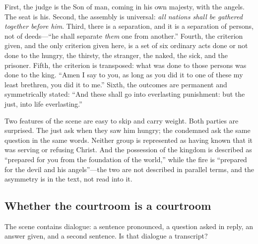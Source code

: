First, the judge is the Son of man, coming in his own majesty, with the angels. The seat is his. Second, the assembly is universal: \emph{all nations shall be gathered together before him}. Third, there is a separation, and it is a separation of persons, not of deeds---``he shall separate \emph{them} one from another.'' Fourth, the criterion given, and the only criterion given here, is a set of six ordinary acts done or not done to the hungry, the thirsty, the stranger, the naked, the sick, and the prisoner. Fifth, the criterion is transposed: what was done to those persons was done to the king. ``Amen I say to you, as long as you did it to one of these my least brethren, you did it to me.'' Sixth, the outcomes are permanent and symmetrically stated: ``And these shall go into everlasting punishment: but the just, into life everlasting.''

Two features of the scene are easy to skip and carry weight. Both parties are surprised. The just ask when they saw him hungry; the condemned ask the same question in the same words. Neither group is represented as having known that it was serving or refusing Christ. And the possession of the kingdom is described as ``prepared for you from the foundation of the world,'' while the fire is ``prepared for the devil and his angels''---the two are not described in parallel terms, and the asymmetry is in the text, not read into it.

\subsection{Whether the courtroom is a courtroom}

The scene contains dialogue: a sentence pronounced, a question asked in reply, an answer given, and a second sentence. Is that dialogue a transcript?

